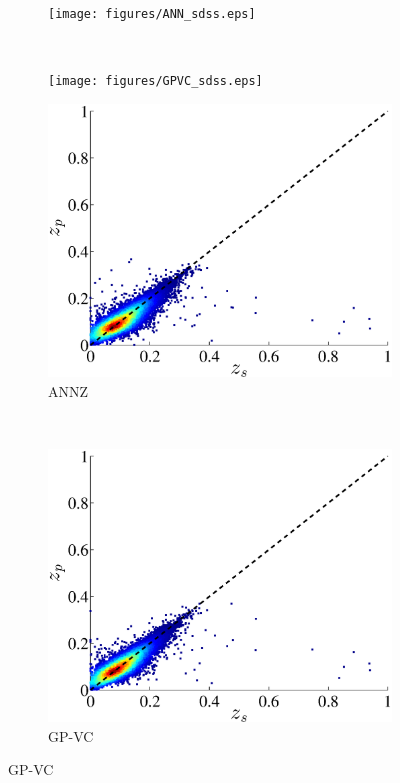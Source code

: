 \documentclass[useAMS,usenatbib,fleqn]{mn2e}
\begin{document}
\begin{figure}
        \centering
       
       \begin{subfigure}[b]{0.35\textwidth}
                \texttt{[image: figures/ANN\_sdss.eps]}
        \end{subfigure}
        ~ 
        \begin{subfigure}[b]{0.35\textwidth}
                \texttt{[image: figures/GPVC\_sdss.eps]}
        \end{subfigure}

        
        \begin{subfigure}[b]{0.35\textwidth}
                \includegraphics[width=\columnwidth]{figures/ANN_sdss_cut.eps}
        \caption{{\sc ANNZ}}
        \end{subfigure}
	~ 
        \begin{subfigure}[b]{0.35\textwidth}
                \includegraphics[width=\columnwidth]{figures/GPVC_sdss_cut.eps}
        \caption{GP-VC}
        \end{subfigure}


\end{figure}
\end{document}
